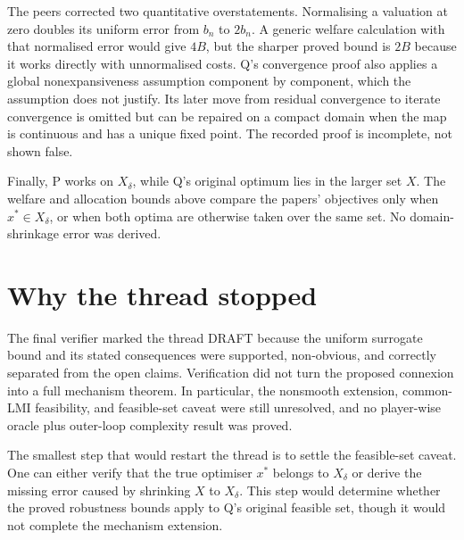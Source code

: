 \documentclass{article}
\begin{document}
The peers corrected two quantitative overstatements.  Normalising a valuation at zero doubles its uniform error from $b_n$ to $2b_n$.  A generic welfare calculation with that normalised error would give $4B$, but the sharper proved bound is $2B$ because it works directly with unnormalised costs.  Q's convergence proof also applies a global nonexpansiveness assumption component by component, which the assumption does not justify.  Its later move from residual convergence to iterate convergence is omitted but can be repaired on a compact domain when the map is continuous and has a unique fixed point.  The recorded proof is incomplete, not shown false.

Finally, P works on $X_\delta$, while Q's original optimum lies in the larger set $X$.  The welfare and allocation bounds above compare the papers' objectives only when $x^*\in X_\delta$, or when both optima are otherwise taken over the same set.  No domain-shrinkage error was derived.

\section{Why the thread stopped}

The final verifier marked the thread DRAFT because the uniform surrogate bound and its stated consequences were supported, non-obvious, and correctly separated from the open claims.  Verification did not turn the proposed connexion into a full mechanism theorem.  In particular, the nonsmooth extension, common-LMI feasibility, and feasible-set caveat were still unresolved, and no player-wise oracle plus outer-loop complexity result was proved.

The smallest step that would restart the thread is to settle the feasible-set caveat.  One can either verify that the true optimiser $x^*$ belongs to $X_\delta$ or derive the missing error caused by shrinking $X$ to $X_\delta$.  This step would determine whether the proved robustness bounds apply to Q's original feasible set, though it would not complete the mechanism extension.



\end{document}
